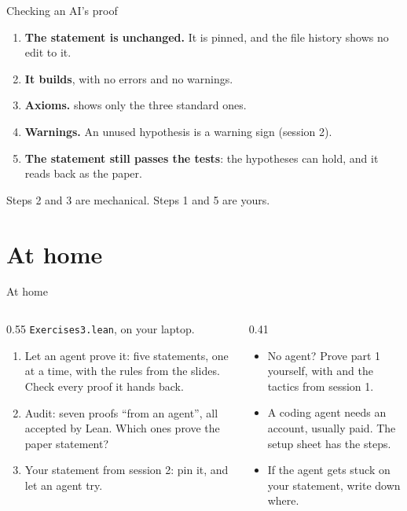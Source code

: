 \documentclass[10pt, aspectratio=169]{beamer}
\begin{document}
\begin{frame}[fragile]{Checking an AI's proof\livedemo}
\begin{enumerate}
\item \textbf{The statement is unchanged.} It is pinned, and the file history shows no edit to it.
\item \textbf{It builds}, with no errors and no  warnings.
\item \textbf{Axioms.}  shows only the three standard ones.
\item \textbf{Warnings.} An unused hypothesis is a warning sign (session 2).
\item \textbf{The statement still passes the tests}: the hypotheses can hold, and it reads back as the paper.
\end{enumerate}

\vspace{0.6em}
\begin{keypoint}
\normalsize Steps 2 and 3 are mechanical. Steps 1 and 5 are yours.
\end{keypoint}
\end{frame}

\section{At home}

\begin{frame}[fragile]{At home}
\begin{columns}[T]
\begin{column}{0.55\textwidth}
\texttt{Exercises3.lean}, on your laptop.
\begin{enumerate}
\item Let an agent prove it: five statements, one at a time, with the rules from the slides. Check every proof it hands back.
\item Audit: seven proofs ``from an agent'', all accepted by Lean. Which ones prove the paper statement?
\item Your statement from session 2: pin it, and let an agent try.
\end{enumerate}
\end{column}
\begin{column}{0.41\textwidth}
\begin{itemize}
\item No agent? Prove part 1 yourself, with  and the tactics from session 1.
\item A coding agent needs an account, usually paid. The setup sheet has the steps.
\item If the agent gets stuck on your statement, write down where.
\end{itemize}
\end{column}
\end{columns}
\end{frame}
\end{document}
